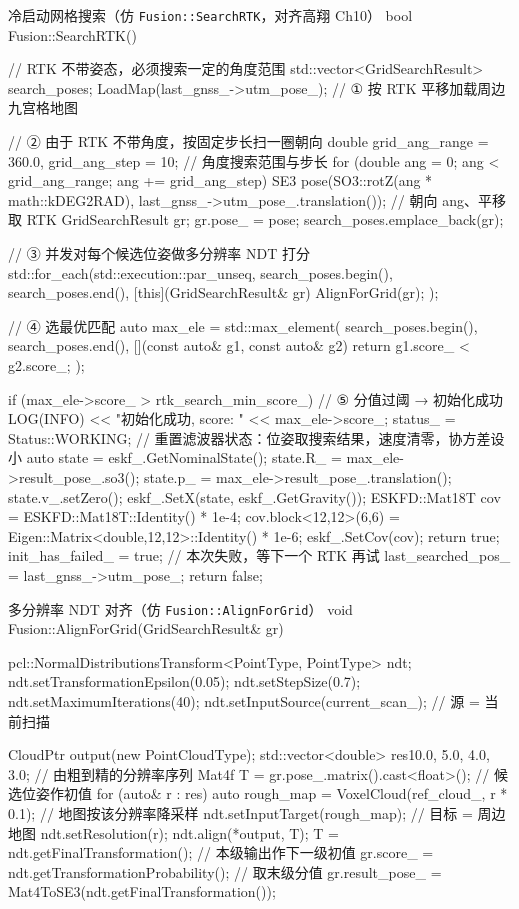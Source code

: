 \begin{codebox}[C++]{冷启动网格搜索（仿 \texttt{Fusion::SearchRTK}，对齐高翔 Ch10）}
bool Fusion::SearchRTK() {
  // RTK 不带姿态，必须搜索一定的角度范围
  std::vector<GridSearchResult> search_poses;
  LoadMap(last_gnss_->utm_pose_);            // ① 按 RTK 平移加载周边九宫格地图

  // ② 由于 RTK 不带角度，按固定步长扫一圈朝向
  double grid_ang_range = 360.0, grid_ang_step = 10;     // 角度搜索范围与步长
  for (double ang = 0; ang < grid_ang_range; ang += grid_ang_step) {
    SE3 pose(SO3::rotZ(ang * math::kDEG2RAD),
             last_gnss_->utm_pose_.translation());        // 朝向 ang、平移取 RTK
    GridSearchResult gr; gr.pose_ = pose;
    search_poses.emplace_back(gr);
  }

  // ③ 并发对每个候选位姿做多分辨率 NDT 打分
  std::for_each(std::execution::par_unseq,
                search_poses.begin(), search_poses.end(),
                [this](GridSearchResult& gr) { AlignForGrid(gr); });

  // ④ 选最优匹配
  auto max_ele = std::max_element(
      search_poses.begin(), search_poses.end(),
      [](const auto& g1, const auto& g2) { return g1.score_ < g2.score_; });

  if (max_ele->score_ > rtk_search_min_score_) {   // ⑤ 分值过阈 → 初始化成功
    LOG(INFO) << "初始化成功, score: " << max_ele->score_;
    status_ = Status::WORKING;
    // 重置滤波器状态：位姿取搜索结果，速度清零，协方差设小
    auto state = eskf_.GetNominalState();
    state.R_ = max_ele->result_pose_.so3();
    state.p_ = max_ele->result_pose_.translation();
    state.v_.setZero();
    eskf_.SetX(state, eskf_.GetGravity());
    ESKFD::Mat18T cov = ESKFD::Mat18T::Identity() * 1e-4;
    cov.block<12,12>(6,6) = Eigen::Matrix<double,12,12>::Identity() * 1e-6;
    eskf_.SetCov(cov);
    return true;
  }
  init_has_failed_ = true;                          // 本次失败，等下一个 RTK 再试
  last_searched_pos_ = last_gnss_->utm_pose_;
  return false;
}
\end{codebox}

\begin{codebox}[C++]{多分辨率 NDT 对齐（仿 \texttt{Fusion::AlignForGrid}）}
void Fusion::AlignForGrid(GridSearchResult& gr) {
  pcl::NormalDistributionsTransform<PointType, PointType> ndt;
  ndt.setTransformationEpsilon(0.05);
  ndt.setStepSize(0.7);
  ndt.setMaximumIterations(40);
  ndt.setInputSource(current_scan_);                 // 源 = 当前扫描

  CloudPtr output(new PointCloudType);
  std::vector<double> res{10.0, 5.0, 4.0, 3.0};      // 由粗到精的分辨率序列
  Mat4f T = gr.pose_.matrix().cast<float>();          // 候选位姿作初值
  for (auto& r : res) {
    auto rough_map = VoxelCloud(ref_cloud_, r * 0.1); // 地图按该分辨率降采样
    ndt.setInputTarget(rough_map);                    // 目标 = 周边地图
    ndt.setResolution(r);
    ndt.align(*output, T);
    T = ndt.getFinalTransformation();                 // 本级输出作下一级初值
  }
  gr.score_ = ndt.getTransformationProbability();     // 取末级分值
  gr.result_pose_ = Mat4ToSE3(ndt.getFinalTransformation());
}
\end{codebox}

